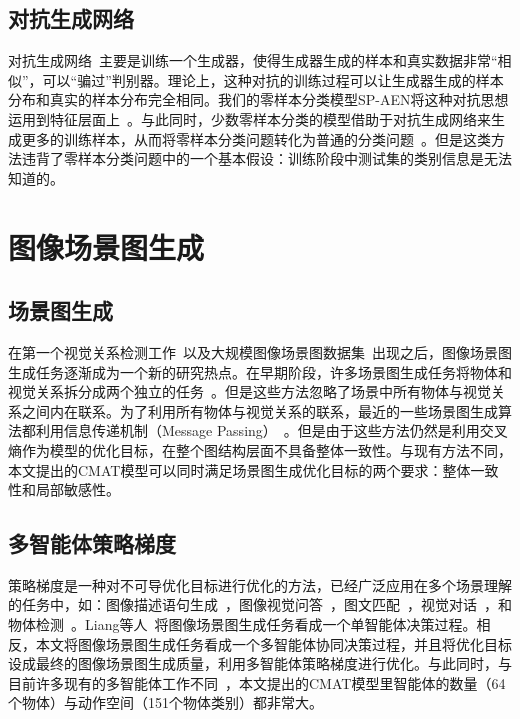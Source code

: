 \subsection{对抗生成网络}
对抗生成网络~\cite{goodfellow2014generative}主要是训练一个生成器，使得生成器生成的样本和真实数据非常“相似”，可以“骗过”判别器。理论上，这种对抗的训练过程可以让生成器生成的样本分布和真实的样本分布完全相同。我们的零样本分类模型SP-AEN将这种对抗思想运用到特征层面上~\cite{odena2017conditional,tzeng2017adversarial,makhzani2015adversarial,shrivastava2017learning}。与此同时，少数零样本分类的模型借助于对抗生成网络来生成更多的训练样本，从而将零样本分类问题转化为普通的分类问题~\cite{mishra2018generative}。但是这类方法违背了零样本分类问题中的一个基本假设：训练阶段中测试集的类别信息是无法知道的。


\section{图像场景图生成}

\subsection{场景图生成}
在第一个视觉关系检测工作~\cite{lu2016visual}以及大规模图像场景图数据集~\cite{krishna2017visual}出现之后，图像场景图生成任务逐渐成为一个新的研究热点。在早期阶段，许多场景图生成任务将物体和视觉关系拆分成两个独立的任务~\cite{lu2016visual,zhang2017visual,zhuang2017towards,zhu2018deep,zhang2017relationship}。但是这些方法忽略了场景中所有物体与视觉关系之间内在联系。为了利用所有物体与视觉关系的联系，最近的一些场景图生成算法都利用信息传递机制（Message Passing）~\cite{xu2017scene,dai2017detecting,li2017scene,li2018factorizable,yin2018zoom,jae2018tensorize,yang2018graph,tang2019learning,gu2019scene,qi2019attentive,wang2019exploring}。但是由于这些方法仍然是利用交叉熵作为模型的优化目标，在整个图结构层面不具备整体一致性。与现有方法不同，本文提出的CMAT模型可以同时满足场景图生成优化目标的两个要求：整体一致性和局部敏感性。


\subsection{多智能体策略梯度}

策略梯度是一种对不可导优化目标进行优化的方法，已经广泛应用在多个场景理解的任务中，如：图像描述语句生成~\cite{ranzato2016sequence,ren2017deep,liu2017improved,rennie2017self,zhang2017actor,liu2018context}，图像视觉问答~\cite{hu2017learning,johnson2017inferring}，图文匹配~\cite{chen2017query,yu2017joint}，视觉对话~\cite{das2017learning}，和物体检测~\cite{caicedo2015active,mathe2016reinforcement,jie2016tree}。Liang等人~\cite{liang2017deep}将图像场景图生成任务看成一个单智能体决策过程。相反，本文将图像场景图生成任务看成一个多智能体协同决策过程，并且将优化目标设成最终的图像场景图生成质量，利用多智能体策略梯度进行优化。与此同时，与目前许多现有的多智能体工作不同~\cite{foerster2016learning,omidshafiei2017deep}，本文提出的CMAT模型里智能体的数量（64个物体）与动作空间（151个物体类别）都非常大。



